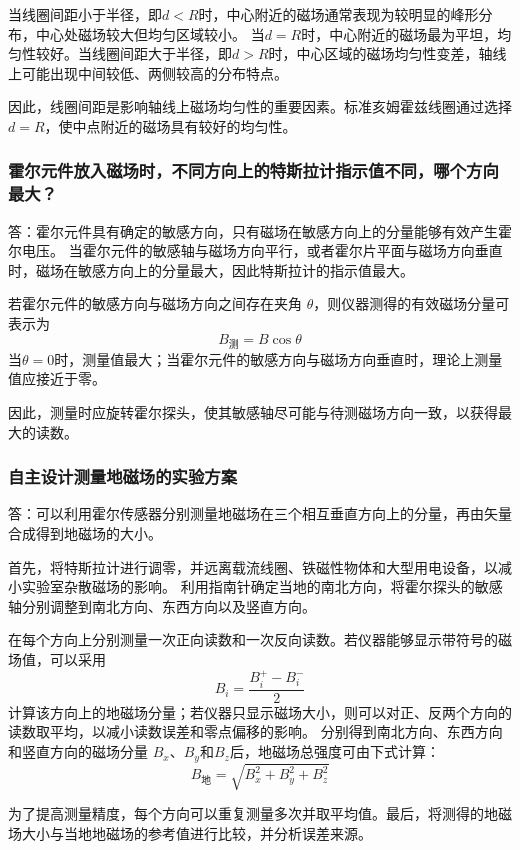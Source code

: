 \documentclass[10pt,a4paper]{ctexart} %
\begin{document}
    当线圈间距小于半径，即$d<R$时，中心附近的磁场通常表现为较明显的峰形分布，中心处磁场较大但均匀区域较小。
    当$d=R$时，中心附近的磁场最为平坦，均匀性较好。当线圈间距大于半径，即$d>R$时，中心区域的磁场均匀性变差，轴线上可能出现中间较低、两侧较高的分布特点。

    因此，线圈间距是影响轴线上磁场均匀性的重要因素。标准亥姆霍兹线圈通过选择$d=R$，使中点附近的磁场具有较好的均匀性。

    \subsubsection{霍尔元件放入磁场时，不同方向上的特斯拉计指示值不同，哪个方向最大？}
    答：霍尔元件具有确定的敏感方向，只有磁场在敏感方向上的分量能够有效产生霍尔电压。
    当霍尔元件的敏感轴与磁场方向平行，或者霍尔片平面与磁场方向垂直时，磁场在敏感方向上的分量最大，因此特斯拉计的指示值最大。

    若霍尔元件的敏感方向与磁场方向之间存在夹角 $\theta$，则仪器测得的有效磁场分量可表示为
    \[
    B_{\text{测}}=B\cos\theta
    \]
    当$\theta=0$时，测量值最大；当霍尔元件的敏感方向与磁场方向垂直时，理论上测量值应接近于零。

    因此，测量时应旋转霍尔探头，使其敏感轴尽可能与待测磁场方向一致，以获得最大的读数。

    \subsubsection{自主设计测量地磁场的实验方案}
    答：可以利用霍尔传感器分别测量地磁场在三个相互垂直方向上的分量，再由矢量合成得到地磁场的大小。

    首先，将特斯拉计进行调零，并远离载流线圈、铁磁性物体和大型用电设备，以减小实验室杂散磁场的影响。
    利用指南针确定当地的南北方向，将霍尔探头的敏感轴分别调整到南北方向、东西方向以及竖直方向。

    在每个方向上分别测量一次正向读数和一次反向读数。若仪器能够显示带符号的磁场值，可以采用
    \[
    B_i=\frac{B_i^{+}-B_i^{-}}{2}
    \]
    计算该方向上的地磁场分量；若仪器只显示磁场大小，则可以对正、反两个方向的读数取平均，以减小读数误差和零点偏移的影响。
    分别得到南北方向、东西方向和竖直方向的磁场分量
    $B_x$、$B_y$和$B_z$后，地磁场总强度可由下式计算：
    \[
    B_{\text{地}}
    =
    \sqrt{B_x^2+B_y^2+B_z^2}
    \]

    为了提高测量精度，每个方向可以重复测量多次并取平均值。最后，将测得的地磁场大小与当地地磁场的参考值进行比较，并分析误差来源。
\end{document}
